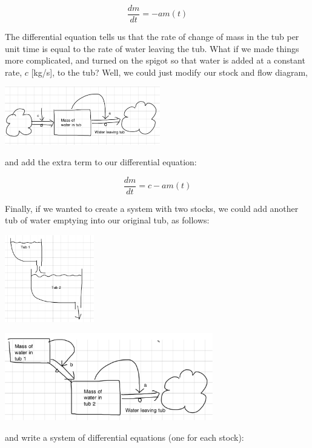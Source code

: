 $$ \frac{dm}{dt}=-am(t)$$

The differential equation tells us that the rate of change of mass in the tub per unit time is equal to the rate of water leaving the tub.
What if we made things more complicated, and turned on the spigot so that water is added at a constant rate, $c$ [kg/s], to the tub? Well, we could just modify our stock and flow diagram,

\beforefig
\centerline{\includegraphics[height=1in]{figs/Tub2StockandFlow.png}}
\afterfig

and add the extra term to our differential equation:

$$\frac{dm}{dt} = c-am(t)$$

Finally, if we wanted to create a system with two stocks, we could add another tub of water emptying into our original tub, as follows:

\beforefig
\centerline{\includegraphics[height=1.5in]{figs/Tub2Schematic.png}}
\afterfig

\beforefig
\centerline{\includegraphics[height=1.5in]{figs/Tub3StockandFlow.png}}
\afterfig

and  write a system of differential equations (one for each stock):

